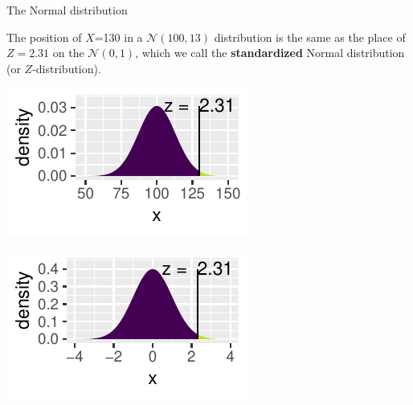 \documentclass[handout]{beamer}\usepackage[]{graphicx}\usepackage[]{color}
\newenvironment{knitrout}{}{} %
\begin{document}
\begin{frame}[fragile]{The Normal distribution}

\vspace*{-.01in}

\small{The position of $X$=130 in a $\mathcal{N}(100,13)$ distribution is the same as
the place of $Z=2.31$ on the $\mathcal{N}(0,1)$, which we call the \textbf{standardized} Normal distribution (or	$Z$-distribution).}
	

\begin{knitrout}\scriptsize
{}\color{fgcolor}

{\centering \includegraphics[width=0.55\linewidth]{figure/probs-1} 

}




{\centering \includegraphics[width=0.55\linewidth]{figure/probs-2} 

}



\end{knitrout}

\end{frame} 

\end{document}
